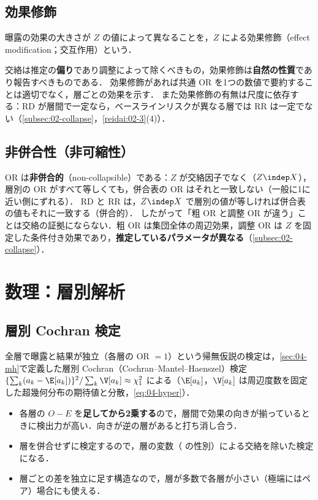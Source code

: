 \subsection{効果修飾}\label{sec:07-modification}
\begin{teigi}[効果修飾]\label{def:07-modification}
曝露の効果の大きさが $Z$ の値によって異なることを，$Z$ による効果修飾（effect modification；交互作用）という．
\end{teigi}
交絡は推定の\textbf{偏り}であり調整によって除くべきもの，効果修飾は\textbf{自然の性質}であり報告すべきものである．
効果修飾があれば共通 OR を1つの数値で要約することは適切でなく，層ごとの効果を示す．
また効果修飾の有無は尺度に依存する：RD が層間で一定なら，ベースラインリスクが異なる層では RR は一定でない（\cref{subsec:02-collapse}，\cref{reidai:02-3}(4)）．

\subsection{非併合性（非可縮性）}\label{subsec:07-noncollapse}
\Hissu OR は\textbf{非併合的}（non-collapsible）である：$Z$ が交絡因子でなく（$Z\indep X$），層別の OR がすべて等しくても，併合表の OR はそれと一致しない（一般に1に近い側にずれる）．
RD と RR は，$Z\indep X$ で層別の値が等しければ併合表の値もそれに一致する（併合的）．
したがって「粗 OR と調整 OR が違う」ことは交絡の証拠にならない．粗 OR は集団全体の周辺効果，調整 OR は $Z$ を固定した条件付き効果であり，\textbf{推定しているパラメータが異なる}（\cref{subsec:02-collapse}）．

\section{数理：層別解析}\label{sec:07-strat}
\subsection{層別 Cochran 検定}\label{subsec:07-mh}
\Hissu\Hinshutsu 全層で曝露と結果が独立（各層の OR $=1$）という帰無仮説の検定は，\cref{sec:04-mh}で定義した層別 Cochran（Cochran--Mantel--Haenszel）検定
$\{\sum_k(a_k-\E[a_k])\}^2/\sum_k\V[a_k]\approx\chi^2_1$ による（$\E[a_k]$，$\V[a_k]$ は周辺度数を固定した超幾何分布の期待値と分散，\cref{eq:04-hyper}）．
\begin{itemize}
\item 各層の $O-E$ を\textbf{足してから2乗する}ので，層間で効果の向きが揃っているときに検出力が高い．向きが逆の層があると打ち消し合う．
\item 層を併合せずに検定するので，層の変数（ の性別）による交絡を除いた検定になる．
\item 層ごとの差を独立に足す構造なので，層が多数で各層が小さい（極端にはペア）場合にも使える．
\end{itemize}

